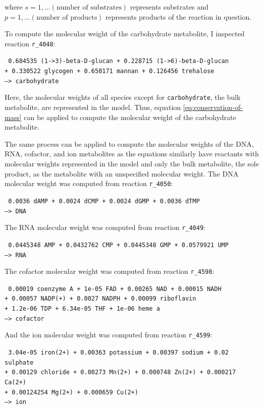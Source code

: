 where $s = 1, ... (\text{number of substrates})$ represents substrates and $p = 1, ... (\text{number of products})$ represents products of the reaction in question.

To compute the molecular weight of the carbohydrate metabolite, I inspected reaction \texttt{r\_4048}:

\texttt{
  0.684535 (1->3)-beta-D-glucan + 0.228715 (1->6)-beta-D-glucan \\
  + 0.330522 glycogen + 0.650171 mannan + 0.126456 trehalose \\
  --> carbohydrate
}

Here, the molecular weights of all species except for \texttt{carbohydrate}, the bulk metabolite, are represented in the model.
Thus, equation \ref{eq:conservation-of-mass} can be applied to compute the molecular weight of the carbohydrate metabolite.

The same process can be applied to compute the molecular weights of the DNA, RNA, cofactor, and ion metabolites as the equations similarly have reactants with molecular weights represented in the model and only the bulk metabolite, the sole product, as the metabolite with an unspecified molecular weight.
The DNA molecular weight was computed from reaction \texttt{r\_4050}:

\texttt{
  0.0036 dAMP + 0.0024 dCMP + 0.0024 dGMP + 0.0036 dTMP \\
  --> DNA
}

The RNA molecular weight was computed from reaction \texttt{r\_4049}:

\texttt{
  0.0445348 AMP + 0.0432762 CMP + 0.0445348 GMP + 0.0579921 UMP \\
  --> RNA
}

The cofactor molecular weight was computed from reaction \texttt{r\_4598}:

\texttt{
  0.00019 coenzyme A + 1e-05 FAD + 0.00265 NAD + 0.00015 NADH \\
  + 0.00057 NADP(+) + 0.0027 NADPH + 0.00099 riboflavin \\
  + 1.2e-06 TDP + 6.34e-05 THF + 1e-06 heme a \\
  --> cofactor
}

And the ion molecular weight was computed from reaction \texttt{r\_4599}:

\texttt{
  3.04e-05 iron(2+) + 0.00363 potassium + 0.00397 sodium + 0.02 sulphate \\
  + 0.00129 chloride + 0.00273 Mn(2+) + 0.000748 Zn(2+) + 0.000217 Ca(2+) \\
  + 0.00124254 Mg(2+) + 0.000659 Cu(2+) \\
  --> ion
}

